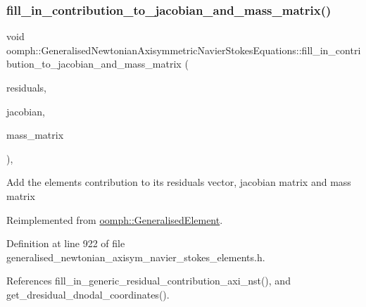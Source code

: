 \subsubsection{\texorpdfstring{fill\+\_\+in\+\_\+contribution\+\_\+to\+\_\+jacobian\+\_\+and\+\_\+mass\+\_\+matrix()}{fill\_in\_contribution\_to\_jacobian\_and\_mass\_matrix()}}
{\footnotesize\ttfamily void oomph\+::\+Generalised\+Newtonian\+Axisymmetric\+Navier\+Stokes\+Equations\+::fill\+\_\+in\+\_\+contribution\+\_\+to\+\_\+jacobian\+\_\+and\+\_\+mass\+\_\+matrix (\begin{DoxyParamCaption}\item[{\hyperlink{classoomph_1_1Vector}{Vector}$<$ double $>$ \&}]{residuals,  }\item[{\hyperlink{classoomph_1_1DenseMatrix}{Dense\+Matrix}$<$ double $>$ \&}]{jacobian,  }\item[{\hyperlink{classoomph_1_1DenseMatrix}{Dense\+Matrix}$<$ double $>$ \&}]{mass\+\_\+matrix }\end{DoxyParamCaption})\hspace{0.3cm}{\ttfamily [inline]}, {\ttfamily [virtual]}}

Add the element\textquotesingle{}s contribution to its residuals vector, jacobian matrix and mass matrix 

Reimplemented from \hyperlink{classoomph_1_1GeneralisedElement_a2b6294a730647cf865da94f2531466f8}{oomph\+::\+Generalised\+Element}.



Definition at line 922 of file generalised\+\_\+newtonian\+\_\+axisym\+\_\+navier\+\_\+stokes\+\_\+elements.\+h.



References fill\+\_\+in\+\_\+generic\+\_\+residual\+\_\+contribution\+\_\+axi\+\_\+nst(), and get\+\_\+dresidual\+\_\+dnodal\+\_\+coordinates().

\mbox{\label{classoomph_1_1GeneralisedNewtonianAxisymmetricNavierStokesEquations_a93e6106a94fe78998c9e9eb63d8825bc}} 
